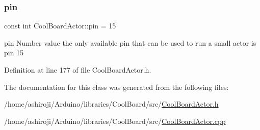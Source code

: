 \mbox{\label{class_cool_board_actor_a8b5c0b41fe6033b68d9e1ed00bc2e122}} 
\subsubsection{\texorpdfstring{pin}{pin}}
{\footnotesize\ttfamily const int Cool\+Board\+Actor\+::pin = 15\hspace{0.3cm}{\ttfamily [private]}}

pin Number value the only available pin that can be used to run a small actor is pin 15 

Definition at line 177 of file Cool\+Board\+Actor.\+h.



The documentation for this class was generated from the following files\+:\begin{DoxyCompactItemize}
\item 
/home/ashiroji/\+Arduino/libraries/\+Cool\+Board/src/\hyperlink{_cool_board_actor_8h}{Cool\+Board\+Actor.\+h}\item 
/home/ashiroji/\+Arduino/libraries/\+Cool\+Board/src/\hyperlink{_cool_board_actor_8cpp}{Cool\+Board\+Actor.\+cpp}\end{DoxyCompactItemize}
